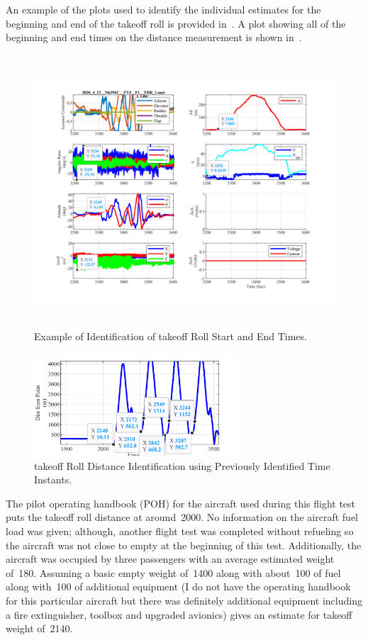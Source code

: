 \documentclass[conf]{new-aiaa}
\begin{document}
An example of the plots used to identify the individual estimates for the beginning and end of the takeoff roll is provided in~. A plot showing all of the beginning and end times on the distance measurement is shown in~.

\begin{figure}[htp!]
\centering
	\includegraphics[height=4in]{TakeoffRollTimeID.png}
	\caption{Example of Identification of takeoff Roll Start and End Times.}
	\label{takeofftimeid}
\end{figure}

\begin{figure}[htp!]
\centering
	\includegraphics[height=1.5in]{TakeoffRollDistID.png}
	\caption{takeoff Roll Distance Identification using Previously Identified Time Instants.}
	\label{taekoffdistanceid}
\end{figure}

The pilot operating handbook (POH) for the aircraft used during this flight test puts the takeoff roll distance at around~\SI{2000}{\foot}. No information on the aircraft fuel load was given; although, another flight test was completed without refueling so the aircraft was not close to empty at the beginning of this test. Additionally, the aircraft was occupied by three passengers with an average estimated weight of~\SI{180}{\poundforce}. Assuming a basic empty weight of~\SI{1400}{\poundforce} along with about~\SI{100}{\poundforce} of fuel along with~\SI{100}{\poundforce} of additional equipment (I do not have the operating handbook for this particular aircraft but there was definitely additional equipment including a fire extinguisher, toolbox and upgraded avionics) gives an estimate for takeoff weight of~\SI{2140}{\poundforce}.
\end{document}
